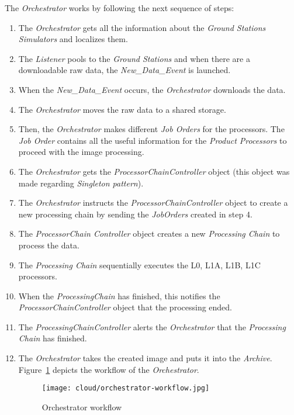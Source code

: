 The \emph{Orchestrator} works by following the next sequence of steps:
\begin{enumerate}
\item The \emph{Orchestrator} gets all the information about the \emph{Ground
    Stations Simulators} and localizes them.
\item The \emph{Listener} pools to the \emph{Ground Stations} and when there are
  a downloadable raw data, the \emph{New\_Data\_Event} is launched.
\item  When the \emph{New\_Data\_Event} occurs, the \emph{Orchestrator} downloads the data.
\item  The \emph{Orchestrator} moves the raw data to a shared storage.
\item Then, the \emph{Orchestrator} makes different \emph{Job Orders} for the processors. The \emph{Job Order} contains all the useful information for the \emph{Product Processors} to proceed with the image processing.
\item The \emph{Orchestrator} gets the \emph{ProcessorChainController} object (this object was made regarding \emph{Singleton pattern}).
\item The \emph{Orchestrator} instructs the \emph{ProcessorChainController} object to create a new processing chain by sending the \emph{JobOrders} created in step 4.
\item The \emph{ProcessorChain Controller} object creates a new \emph{Processing Chain} to process the data.
\item The \emph{Processing Chain} sequentially executes the L0, L1A, L1B, L1C processors.
\item When the \emph{ProcessingChain} has finished, this notifies the \emph{ProcessorChainController} object that the processing ended.
\item The \emph{ProcessingChainController} alerts the \emph{Orchestrator} that the \emph{Processing Chain} has finished.
\item The \emph{Orchestrator} takes the created image and puts it into the \emph{Archive}.
Figure~\ref{fig:orchestrator-workflow} depicts the workflow of the \emph{Orchestrator}.

\begin{figure}[!h]
\begin{center}
\texttt{[image: cloud/orchestrator-workflow.jpg]}
\caption{Orchestrator workflow}
\label{fig:orchestrator-workflow}
\end{center}
\end{figure}


\end{enumerate}
